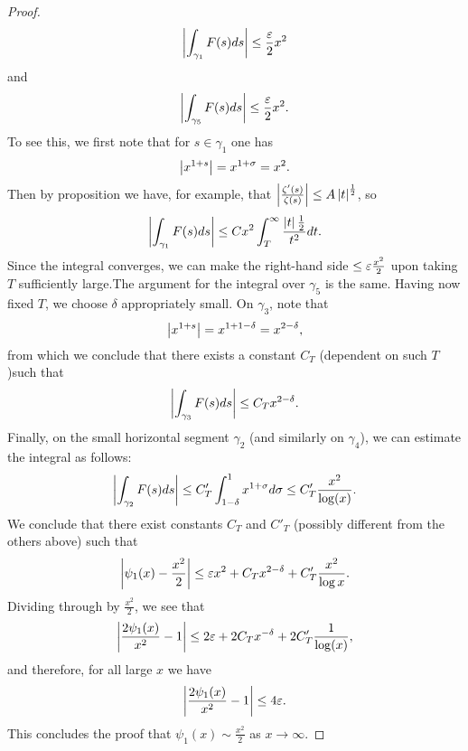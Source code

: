 \begin{proof}
\begin{equation*}
	\left|\int _{\gamma_1} F(s) ds\right|\leq \frac{\varepsilon}{2} x^2
\end{equation*}
	and
\begin{equation*}
	\left|\int _{\gamma_5} F(s) ds\right|\leq \frac{\varepsilon}{2} x^2.
\end{equation*}
	To see this, we first note that for $s \in \gamma_1$ one has
\begin{equation*}
	\left|x^{1 + s}\right| = x^{1 + \sigma} = x^2.
\end{equation*}
	Then by proposition we have, for example, that $\left|\frac{\zeta'(s)}{\zeta(s)}\right| \leq A \left|t\right|^{\frac{1}{2}}$, so
\begin{equation*}
	\left|\int _{\gamma_1} F(s) ds\right| \leq C x^2 \int _T ^\infty \frac{\left|t\right|\frac{1}{2}}{t^2} dt.
\end{equation*}
	Since the integral converges, we can make the right-hand side $\leq \varepsilon \frac{x^2}{2}$ upon taking $T$ sufficiently large.The argument for the integral over $\gamma_5$ is the same. Having now fixed $T$, we choose $\delta$ appropriately small. On $\gamma_3$, note that
\begin{equation*}
	\left|x^{1 + s}\right| = x^{1 + 1 - \delta} = x^{2 - \delta},
\end{equation*}
	from which we conclude that there exists a constant $C_T$ (dependent on such $T$)such that
\begin{equation*}
	\left|\int _{\gamma_3} F(s) ds\right| \leq C_T x^{2 - \delta}.
\end{equation*}
	Finally, on the small horizontal segment $\gamma_2$ (and similarly on $\gamma_4$), we can estimate the integral as follows:
\begin{equation*}
	\left|\int _{\gamma_2} F(s) ds\right| \leq C'_T \int _{1 - \delta} ^1 x^{1 + \sigma} d\sigma \leq C'_T \frac{x^2}{\log(x)}.
\end{equation*}
	We conclude that there exist constants $C_T$ and $C'_T$ (possibly different from the others above) such that
\begin{equation*}
	\left|\psi_1(x) - \frac{x^2}{2}\right| \leq \varepsilon x^2 + C_T x^{2 - \delta} + C'_T \frac{x^2}{\log{x}}.
\end{equation*}
	Dividing through by $\frac{x^2}{2}$, we see that
\begin{equation*}
	\left|\frac{2 \psi_1(x)}{x^2} - 1\right| \leq 2\varepsilon + 2 C_T x^{-\delta} + 2 C'_T \frac{1}{\log(x)},
\end{equation*}
	and therefore, for all large $x$ we have
\begin{equation*}
	\left|\frac{2 \psi_1(x)}{x^2} - 1\right| \leq 4 \varepsilon.
\end{equation*}
	This concludes the proof that $\psi_1(x) \sim \frac{x^2}{2}$ as $x \to \infty$.
\end{proof}